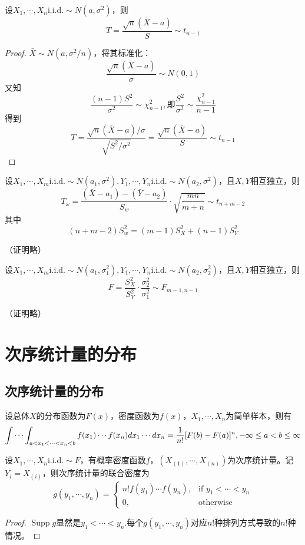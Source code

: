 \documentclass{ctexbook}
\newcommand{\iid}{\text{i.i.d.}}          %
\DeclareMathOperator{\Supp}{Supp}        %
\begin{document}
\begin{corollary}
    设$X_1,\cdots,X_n\iid\sim N(a,\sigma^2)$，则
    $$T=\frac{\sqrt{n}(\bar{X}-a)}{S}\sim t_{n-1}$$
\end{corollary}
\begin{proof}
    $\bar{X}\sim N(a,\sigma^2/n)$，将其标准化：
    $$\frac{\sqrt{n}(\bar{X}-a)}{\sigma}\sim N(0,1)$$
    又知
    $$\frac{(n-1)S^2}{\sigma^2}\sim \chi_{n-1}^2,\text{即}\frac{S^2}{\sigma^2}\sim\frac{\chi_{n-1}^2}{n-1}$$
    得到
    $$T=\frac{\sqrt{n}(\bar{X}-a)/\sigma}{\sqrt{S^2/\sigma^2}}=\frac{\sqrt{n}(\bar{X}-a)}{S}\sim t_{n-1}$$
\end{proof}

\begin{corollary}
    设$X_1,\cdots,X_m\iid\sim N(a_1,\sigma^2),Y_1,\cdots,Y_n\iid\sim N(a_2,\sigma^2)$，且$X,Y$相互独立，则
    $$T_{\omega}=\frac{(\bar{X}-a_1)-(\bar{Y}-a_2)}{S_w}\cdot\sqrt{\frac{mn}{m+n}}\sim t_{n+m-2}$$
    其中
    $$(n+m-2)S_w^2=(m-1)S_X^2+(n-1)S_Y^2$$
\end{corollary}
（证明略）

\begin{corollary}
    设$X_1,\cdots,X_m\iid\sim N(a_1,\sigma_1^2),Y_1,\cdots,Y_n\iid\sim N(a_2,\sigma_2^2)$，且$X,Y$相互独立，则
    $$F=\frac{S_X^2}{S_Y^2}\cdot\frac{\sigma_2^2}{\sigma_1^2}\sim F_{m-1,n-1}$$
\end{corollary}
（证明略）

\section{次序统计量的分布}

\subsection{次序统计量的分布}

\begin{lemma}
    设总体$X$的分布函数为$F(x)$，密度函数为$f(x)$，$X_1,\cdots,X_n$为简单样本，则有
    $$\idotsint_{a<x_1<\cdots<x_n<b}f(x_1)\cdots f(x_n)dx_1\cdots dx_n=\frac{1}{n!}[F(b)-F(a)]^n,-\infty\le a<b\le \infty$$
\end{lemma}

\begin{theorem}[次序统计量的分布]
    设$X_1,\cdots,X_n\iid\sim F$，有概率密度函数$f$，$(X_{(1)},\cdots,X_{(n)})$为次序统计量。记$Y_i=X_{(i)}$，则次序统计量的联合密度为
    $$g(y_1,\cdots,y_n)=\begin{cases}
        n!f(y_1)\cdots f(y_n),&\text{if }y_1<\cdots<y_n\\
        0,&\text{otherwise}
    \end{cases}$$
\end{theorem}
\begin{proof}
    $\Supp g$显然是$y_1<\cdots<y_n$.每个$g(y_1,\cdots,y_n)$对应$n!$种排列方式导致的$n!$种情况。
\end{proof}
\end{document}
